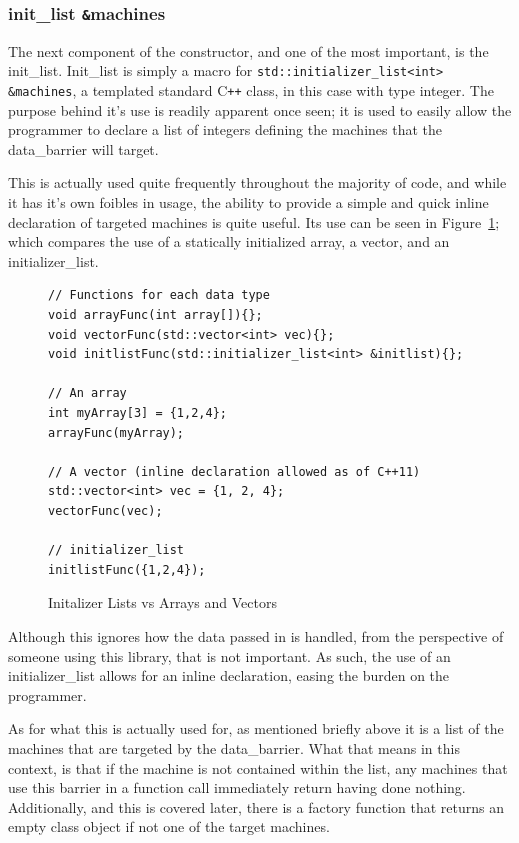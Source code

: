 \documentclass[../thesis.tex]{subfiles}
\begin{document}
  \subsubsection{init\_list \texttt{\&}machines} %
  \label{ssub:init_list}
    The next component of the constructor, and one of the most important, is the init\_list. Init\_list is simply a macro for \newline\texttt{std::initializer\_list<int> \&machines}, a templated standard C\texttt{++} class, in this case with type integer. The purpose behind it's use is readily apparent once seen; it is used to easily allow the programmer to declare a list of integers defining the machines that the data\_barrier will target.

    This is actually used quite frequently throughout the majority of code, and while it has it's own foibles in usage, the ability to provide a simple and quick inline declaration of targeted machines is quite useful. Its use can be seen in Figure~\ref{fig:init_list_vs_others}; which compares the use of a statically initialized array, a vector, and an initializer\_list.

     \begin{figure}[htbp]
      \centering

      \lstset{language=cpp}  
      \begin{lstlisting}[tabsize=2]
// Functions for each data type
void arrayFunc(int array[]){};
void vectorFunc(std::vector<int> vec){};
void initlistFunc(std::initializer_list<int> &initlist){};

// An array
int myArray[3] = {1,2,4};
arrayFunc(myArray);

// A vector (inline declaration allowed as of C++11)
std::vector<int> vec = {1, 2, 4};
vectorFunc(vec);

// initializer_list
initlistFunc({1,2,4});
        \end{lstlisting}

      \caption{Initalizer Lists vs Arrays and Vectors}
      \label{fig:init_list_vs_others}
    \end{figure}

    Although this ignores how the data passed in is handled, from the perspective of someone using this library, that is not important. As such, the use of an initializer\_list allows for an inline declaration, easing the burden on the programmer.

    As for what this is actually used for, as mentioned briefly above it is a list of the machines that are targeted by the data\_barrier. What that means in this context, is that if the machine is not contained within the list, any machines that use this barrier in a function call immediately return having done nothing. Additionally, and this is covered later, there is a factory function that returns an empty class object if not one of the target machines.
\end{document}
